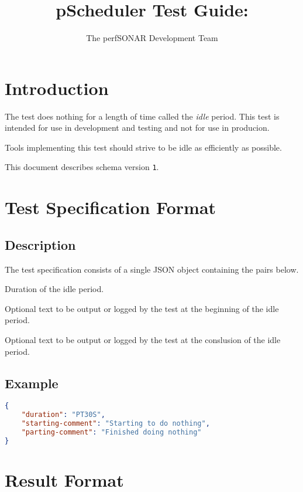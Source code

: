 \documentclass[10pt]{article}
\title{pScheduler Test Guide: {\it \testname}}
\author{The perfSONAR Development Team}
\begin{document}
\maketitle


%
%

\section{Introduction}

The {\tt \testname} test does nothing for a length of time called the
{\it idle} period.  This test is intended for use in development and
testing and not for use in producion.

Tools implementing this test should strive to be idle as efficiently
as possible.

This document describes schema version {\tt 1}.


%
%

\section{Test Specification Format}

\subsection{Description}

The test specification consists of a single JSON object containing the
pairs below.  \seejson


 Duration of the idle period.

 Optional text to be output or
logged by the test at the beginning of the idle period.

 Optional text to be output or
logged by the test at the conslusion of the idle period.

\subsection{Example}
\begin{lstlisting}[language=json]
{
    "duration": "PT30S",
    "starting-comment": "Starting to do nothing",
    "parting-comment": "Finished doing nothing"
}
\end{lstlisting}


%
%

\section{Result Format}
\end{document}
